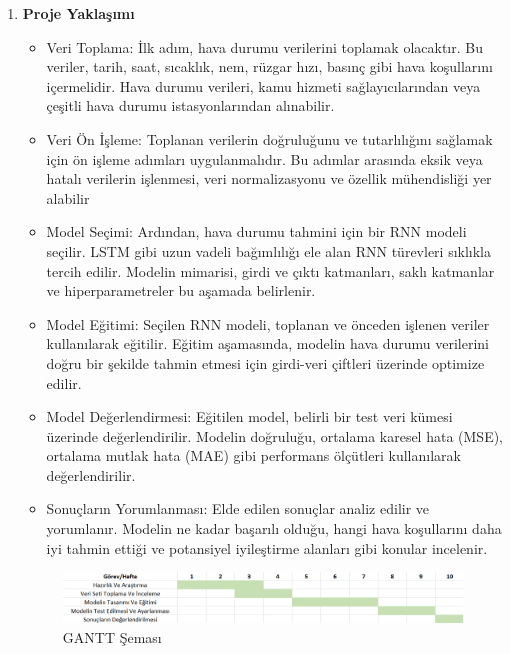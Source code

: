 \documentclass[12pt,a4paper]{article}
\begin{document}
\begin{enumerate}
 \item {\bf\fontsize{12pt}{14pt}\selectfont Proje Yaklaşımı} 
  \begin{itemize}
  	\item Veri Toplama: İlk adım, hava durumu verilerini toplamak olacaktır. Bu veriler, tarih, saat, sıcaklık, nem, rüzgar hızı, basınç gibi hava koşullarını içermelidir. Hava durumu verileri, kamu hizmeti sağlayıcılarından veya çeşitli hava durumu istasyonlarından alınabilir.
  	\item Veri Ön İşleme: Toplanan verilerin doğruluğunu ve tutarlılığını sağlamak için ön işleme adımları uygulanmalıdır. Bu adımlar arasında eksik veya hatalı verilerin işlenmesi, veri normalizasyonu ve özellik mühendisliği yer alabilir
  	\item Model Seçimi: Ardından, hava durumu tahmini için bir RNN modeli seçilir. LSTM gibi uzun vadeli bağımlılığı ele alan RNN türevleri sıklıkla tercih edilir. Modelin mimarisi, girdi ve çıktı katmanları, saklı katmanlar ve hiperparametreler bu aşamada belirlenir.
        \item Model Eğitimi: Seçilen RNN modeli, toplanan ve önceden işlenen veriler kullanılarak eğitilir. Eğitim aşamasında, modelin hava durumu verilerini doğru bir şekilde tahmin etmesi için girdi-veri çiftleri üzerinde optimize edilir.
        \item Model Değerlendirmesi: Eğitilen model, belirli bir test veri kümesi üzerinde değerlendirilir. Modelin doğruluğu, ortalama karesel hata (MSE), ortalama mutlak hata (MAE) gibi performans ölçütleri kullanılarak değerlendirilir.
        \item Sonuçların Yorumlanması: Elde edilen sonuçlar analiz edilir ve yorumlanır. Modelin ne kadar başarılı olduğu, hangi hava koşullarını daha iyi tahmin ettiği ve potansiyel iyileştirme alanları gibi konular incelenir.
      
  \end{itemize}
  \begin{figure}[h]
  	\caption{GANTT Şeması}
  	\vspace{0.5cm} 
  	\centering
  	 \includegraphics[width=\textwidth,height=\textheight,keepaspectratio]{Gantt .png}
  	
  		\vspace{0.7cm}
  	

\end{figure}
\end{enumerate}
\end{document}
